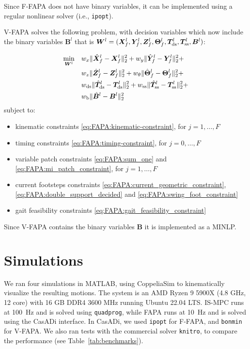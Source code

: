 \medskip

Since F-FAPA does not have binary variables, it can be implemented using a
regular nonlinear solver (i.e., \texttt{ipopt}).

V-FAPA solves the following problem, with decision variables which now include
the binary variables $\bm{B}^{l}$ that is ${\bm{W}}^l = (\bm{X}_f^l, \bm{Y}_f^l, \bm{Z}_f^l, \bm{\Theta}_f^l, \bm{T}_{\rm ds}^l, \bm{T}_{\rm ss}^l, \bm{B}^{l})$:
\begin{braced}
    \begin{equation*}
        \begin{split}
            \min_{{\bm{W}}^l} \quad
            & w_x \| \hat{\bm{X}}_f^l - \bm{X}_f^l \|_2^2 + w_y \| \hat{\bm{Y}}_f^l - \bm{Y}_f^l \|_2^2 + \\& w_z \| \hat{\bm{Z}}_f^l - \bm{Z}_f^l \|_2^2 + w_{\theta} \| \hat{\bm{\Theta}}_f^l - \bm{\Theta}_f^l \|_2^2 + \\& w_{\rm ds} \| \hat{\bm{T}}_{\rm ds}^l - \bm{T}_{\rm ds}^l \|_2^2 + w_{\rm ss} \| \hat{\bm{T}}_{\rm ss}^l - \bm{T}_{\rm ss}^l \|_2^2 +  \\&
            w_{\rm b} \| \hat{\bm{B}}^l - \bm{B}^l \|_2^2
        \end{split}
    \end{equation*}
    \hspace{0.25cm} subject to:
    \begin{itemize}
        \item kinematic constraints \eqref{eq:FAPA:kinematic-constraint}, for $j=1,\dots,F$
        \item timing constraints \eqref{eq:FAPA:timing-constraint}, for $j=0,\dots,F$
        \item variable patch constraints \eqref{eq:FAPA:sum_one} and \eqref{eq:FAPA:mi_patch_constraint}, for $j=1,\dots,F$
        \item current footsteps constraints \eqref{eq:FAPA:current_geometric_constraint}, \eqref{eq:FAPA:double_support_decided} and \eqref{eq:FAPA:swing_foot_constraint}
        \item gait feasibility constraints \eqref{eq:FAPA:gait_feasibility_constraint}
    \end{itemize}
\end{braced}

\medskip

Since V-FAPA contains the binary variables $\bm{B}$ it is implemented as a MINLP.

\section{Simulations}
\label{sec:FAPA:Simulations}
We ran four simulations in MATLAB, using CoppeliaSim to kinematically
visualize the resulting motions. The system is an AMD Ryzen 9 5900X
(4.8 GHz, 12 core) with 16 GB DDR4 3600 MHz running Ubuntu 22.04 LTS. IS-MPC
runs at 100~Hz and is solved using \texttt{quadprog}, while FAPA runs at
10~Hz and is solved using the CasADi interface. In CasADi, we used
\texttt{ipopt} for F-FAPA, and \texttt{bonmin} for V-FAPA. We also ran tests
with the commercial solver \texttt{knitro}, to compare the performance
(see Table~\ref{tab:benchmarks}).

